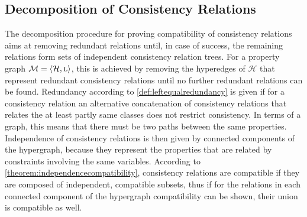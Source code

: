 \subsection{Decomposition of Consistency Relations}

The decomposition procedure for proving compatibility of consistency relations aims at removing redundant relations until, in case of success, the remaining relations form sets of independent consistency relation trees.
For a property graph $\mathcal{M} = \langle \mathcal{H}, \textsc{l} \rangle$, this is achieved by removing the hyperedges of $\mathcal{H}$ that represent redundant consistency relations until no further redundant relations can be found.
Redundancy according to \autoref{def:leftequalredundancy} is given if for a consistency relation an alternative concatenation of consistency relations that relates the at least partly same classes does not restrict consistency.
In terms of a graph, this means that there must be two paths between the same properties.
Independence of consistency relations is then given by connected components of the hypergraph, because they represent the properties that are related by constraints involving the same \qvtr variables.
According to \autoref{theorem:independencecompatibility}, consistency relations are compatible if they are composed of independent, compatible subsets, thus if for the relations in each connected component of the hypergraph compatibility can be shown, their union is compatible as well.


